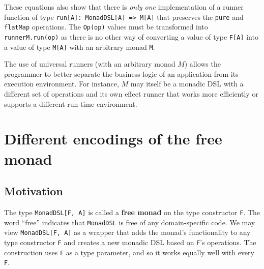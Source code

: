 These equations also show that there is \emph{only one} implementation
of a runner function of type \lstinline!run[A]: MonadDSL[A] => M[A]!
that preserves the \lstinline!pure!
and \lstinline!flatMap!
operations. The \lstinline!Op(op)!
values must be transformed into \lstinline!runnerM.run(op)!
as there is no other way of converting a value of type \lstinline!F[A]!
into a value of type \lstinline!M[A]!
with an arbitrary monad \lstinline!M!. 

The use of universal runners (with an arbitrary monad $M$) allows
the programmer to better separate the business logic of an application
from its execution environment. For instance, $M$ may itself be a
monadic DSL with a different set of operations and its own effect
runner that works more efficiently or supports a different run-time
environment.

\section{Different encodings of the free monad}

\subsection{Motivation\label{subsec:Motivation-free-monad-different-encodings}}

The type \lstinline!MonadDSL[F, A]!
is called a \textbf{free monad} on the type constructor
\lstinline!F!. The word
\textsf{``}free\textsf{''} indicates that \lstinline!MonadDSL!
is free of any domain-specific code. We may view \lstinline!MonadDSL[F, A]!
as a wrapper that adds the monad\textsf{'}s functionality to any type constructor
\lstinline!F! and creates
a new monadic DSL based on \lstinline!F!\textsf{'}s
operations. The construction uses \lstinline!F!
as a type parameter, and so it works equally well with every \lstinline!F!.

